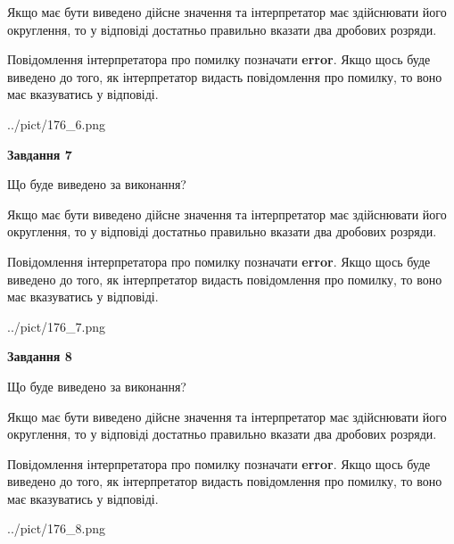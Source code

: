 \documentclass[12pt, ukrainian]{article}
\begin{document}
{\begin {Large}
Якщо має бути виведено дійсне значення та інтерпретатор має здійснювати його округлення, 
то у відповіді достатньо правильно вказати два дробових розряди.

Повідомлення інтерпретатора про помилку позначати \textbf{error}.
Якщо щось буде виведено до того, як інтерпретатор видасть повідомлення про помилку, 
то воно має вказуватись у відповіді. \par

\begin{center}
	{../pict/176_6.png}
\end{center}
\newpage

{\begin {center}\textbf{Завдання 7}\end {center}}\par
Що буде виведено за виконання? \par

Якщо має бути виведено дійсне значення та інтерпретатор має здійснювати його округлення, 
то у відповіді достатньо правильно вказати два дробових розряди.

Повідомлення інтерпретатора про помилку позначати \textbf{error}.
Якщо щось буде виведено до того, як інтерпретатор видасть повідомлення про помилку, 
то воно має вказуватись у відповіді. \par

\begin{center}
	{../pict/176_7.png}
\end{center}
\newpage

{\begin {center}\textbf{Завдання 8}\end {center}}\par
Що буде виведено за виконання? \par

Якщо має бути виведено дійсне значення та інтерпретатор має здійснювати його округлення, 
то у відповіді достатньо правильно вказати два дробових розряди.

Повідомлення інтерпретатора про помилку позначати \textbf{error}.
Якщо щось буде виведено до того, як інтерпретатор видасть повідомлення про помилку, 
то воно має вказуватись у відповіді. \par

\begin{center}
	{../pict/176_8.png}
\end{center}
\newpage


\end{Large}}
\end{document}
